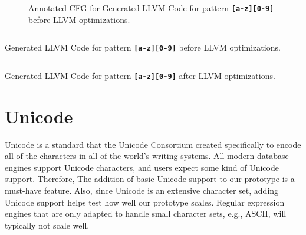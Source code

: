 \begin{figure}[htbp]
    \caption{Annotated CFG for Generated LLVM Code for pattern \texttt{\textbf{[a-z][0-9]}} before LLVM optimizations.}
    \label{fig:annocfg}
\end{figure}


\begin{longlisting}
\inputminted[breaklines=true,frame=lines,linenos]{llvm}{code/irbefore.ll}
\caption{Generated LLVM Code for pattern \texttt{\textbf{[a-z][0-9]}} before LLVM optimizations.}
\label{lst:llvmex}
\end{longlisting}


\begin{listing}[H]
\inputminted[breaklines=true,frame=lines,linenos]{llvm}{code/irafter.ll}
\caption{Generated LLVM Code for pattern \texttt{\textbf{[a-z][0-9]}} after LLVM optimizations.}
\label{lst:llvmexs}
\end{listing}

\section{Unicode}
Unicode is a standard that the Unicode Consortium created specifically to encode all of the characters in all of the world's writing systems. All modern database engines support Unicode characters, and users expect some kind of Unicode support. Therefore, The addition of basic Unicode support to our prototype is a must-have feature. Also, since Unicode is an extensive character set, adding Unicode support helps test how well our prototype scales. Regular expression engines that are only adapted to handle small character sets, e.g., ASCII, will typically not scale well.


